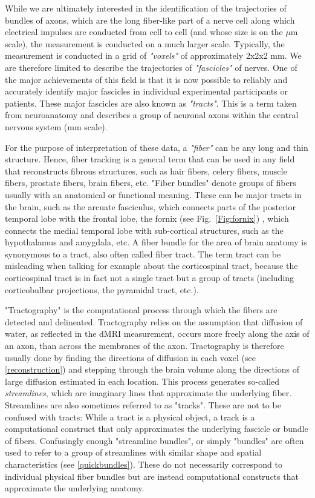 \documentclass{bioinfo}
\begin{document}
While we are ultimately interested in the identification of the trajectories of
bundles of axons, which are the long fiber-like part of a nerve cell along
which electrical impulses are conducted from cell to cell (and whose
size is on the $\mu$m scale), the measurement is conducted on a much larger
scale. Typically, the measurement is conducted in a grid of \emph{"voxels"} of
approximately 2x2x2 mm. We are therefore limited to describe the trajectories
of \emph{"fascicles"} of nerves. One of the major achievements of this
field is that it is now possible to reliably and accurately identify
major fascicles in
individual experimental participants or patients. These major fascicles are
also known as \emph{"tracts"}. This is a term taken from neuroanatomy
and describes a group of neuronal axons within the central nervous
system (mm scale).

For the purpose of interpretation of these data, a \emph{"fiber"} can be any long and
thin structure. Hence, fiber tracking is a general term that can be used in any
field that reconstructs fibrous structures, such as hair fibers, celery fibers,
muscle fibers, prostate fibers, brain fibers, etc. "Fiber bundles" denote
groups of fibers usually with an anatomical or functional meaning. These can be
major tracts in the brain, such as the arcuate fasciculus, which connects parts
of the posterior temporal lobe with the frontal lobe, the fornix (see Fig.~\ref{Fig:fornix}) , which
connects the medial temporal lobe with sub-cortical structures, such as the
hypothalamus and amygdala, etc. A fiber bundle for the area of brain anatomy is
synonymous to a tract, also often called fiber tract. The term tract can be
misleading when talking for example about the corticospinal tract, because the
corticospinal tract is in fact not a single tract but a group of tracts
(including corticobulbar projections, the pyramidal tract, etc.).

"Tractography" is the computational process through which the fibers are detected
and delineated. Tractography relies on the assumption that diffusion of water,
as reflected in the dMRI measurement, occurs more freely along the axis of an
axon, than across the membranes of the axon. Tractography is therefore usually
done by finding the directions of diffusion in each voxel (see
\ref{reconstruction}) and stepping through the brain volume along the
directions of large diffusion estimated in each location. This process
generates so-called \emph{streamlines}, which are imaginary lines that approximate the
underlying fiber. Streamlines are also sometimes referred to as "tracks". These
are not to be confused with tracts: While a tract is a physical object, a track
is a computational construct that only approximates the underlying fascicle or
bundle of fibers. Confusingly enough "streamline bundles", or simply "bundles"
are often used to refer to a group of streamlines with similar shape and
spatial characteristics (see \ref{quickbundles}). These do not necessarily
correspond to individual physical fiber bundles but are instead computational
constructs that approximate the underlying anatomy.
\end{document}
